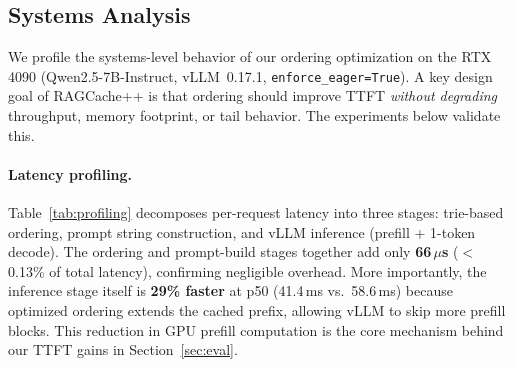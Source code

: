 \documentclass{article}
\begin{document}
\subsection{Systems Analysis}
\label{sec:systems}

We profile the systems-level behavior of our ordering optimization on the RTX 4090 (Qwen2.5-7B-Instruct, vLLM~0.17.1, \texttt{enforce\_eager=True}). A key design goal of RAGCache++ is that ordering should improve TTFT \emph{without degrading} throughput, memory footprint, or tail behavior. The experiments below validate this.

\paragraph{Latency profiling.}
Table~\ref{tab:profiling} decomposes per-request latency into three stages: trie-based ordering, prompt string construction, and vLLM inference (prefill + 1-token decode). The ordering and prompt-build stages together add only \textbf{66\,$\mu$s} ($<$0.13\% of total latency), confirming negligible overhead. More importantly, the inference stage itself is \textbf{29\% faster} at p50 (41.4\,ms vs.\ 58.6\,ms) because optimized ordering extends the cached prefix, allowing vLLM to skip more prefill blocks. This reduction in GPU prefill computation is the core mechanism behind our TTFT gains in Section~\ref{sec:eval}.

\begin{table}[t]
\caption{Per-request latency breakdown (RTX 4090, 195 post-warmup queries). Ordering adds 66\,$\mu$s while reducing inference p50 by 29\%.}
\label{tab:profiling}
\centering
\small
{}
\vspace{-0.5em}
\end{table}
\end{document}
